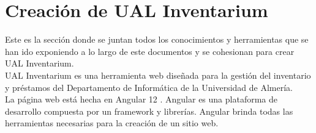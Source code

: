 \section{Creación de UAL Inventarium}\label{sec:4_web}
Este es la sección donde se juntan todos los conocimientos y herramientas que se han ido exponiendo a lo largo de este documentos y se cohesionan para crear UAL Inventarium.
\\UAL Inventarium es una herramienta web diseñada para la gestión del inventario y préstamos del Departamento de Informática de la Universidad de Almería.
\\La página web está hecha en Angular 12 \cite{angular-book}. Angular es una plataforma de desarrollo compuesta por un framework y librerías. Angular brinda todas las herramientas necesarias para la creación de un sitio web.






















